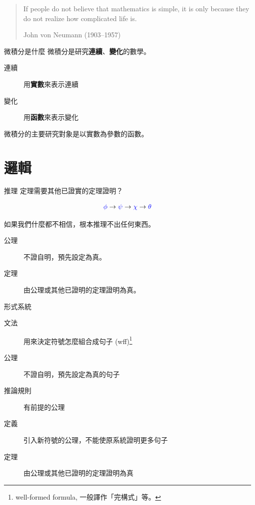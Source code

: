 \documentclass{Slideshow}
\begin{document}
\begin{frame}
    \begin{quote}
        If people do not believe that mathematics is simple, it is only because
        they do not realize how complicated life is.

        \begin{flushright}
            \textup{John von Neumann (1903--1957)}
        \end{flushright}
    \end{quote}
\end{frame}

\begin{frame}{微積分是什麼}
    微積分是研究\textbf{連續}、\textbf{變化}的數學。

    \begin{description}
        \item[連續] 用\textbf{實數}來表示連續
        \item[變化] 用\textbf{函數}來表示變化
    \end{description}

    微積分的主要研究對象是以實數為參數的函數。
\end{frame}

\section{邏輯}
\begin{frame}{推理}
    定理需要其他已證實的定理證明？

    \[ {\color{blue}\phi} \to {\color{blue}\psi} \to {\color{blue}\chi} \to {\color{blue}\theta} \]

    如果我們什麼都不相信，根本推理不出任何東西。

    \begin{description}
        \item[公理] 不證自明，預先設定為真。
        \item[定理] 由公理或其他已證明的定理證明為真。
    \end{description}
\end{frame}

\begin{frame}{形式系統}
    \begin{description}
        \item[文法] 用來決定符號怎麼組合成句子 (wff)\footnote{well-formed
            formula, 一般譯作「完構式」等。}
        \item[公理] 不證自明，預先設定為真的句子
        \item[推論規則] 有前提的公理
        \item[定義] 引入新符號的公理，不能使原系統證明更多句子
        \item[定理] 由公理或其他已證明的定理證明為真
    \end{description}
\end{frame}
\end{document}
